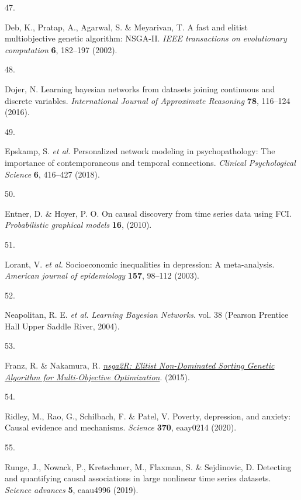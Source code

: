 \documentclass[
]{article}
\newlength{\cslhangindent}
\newlength{\csllabelwidth}
\newenvironment{CSLReferences}[2] %
 {\begin{list}{}{%
  \setlength{\itemindent}{0pt}
  \setlength{\leftmargin}{0pt}
  \setlength{\parsep}{0pt}
  \ifodd #1
   \setlength{\leftmargin}{\cslhangindent}
   \setlength{\itemindent}{-1\cslhangindent}
  \fi
  \setlength{\itemsep}{#2\baselineskip}}}
 {\end{list}}
\newcommand{\CSLLeftMargin}[1]{\parbox[t]{\csllabelwidth}{\strut#1\strut}}
\newcommand{\CSLRightInline}[1]{\parbox[t]{\linewidth - \csllabelwidth}{\strut#1\strut}}
\begin{document}
\begin{CSLReferences}{0}{0}
\CSLLeftMargin{47. }%
\CSLRightInline{Deb, K., Pratap, A., Agarwal, S. \& Meyarivan, T. A fast
and elitist multiobjective genetic algorithm: NSGA-II. \emph{IEEE
transactions on evolutionary computation} \textbf{6}, 182--197 (2002).}

\CSLLeftMargin{48. }%
\CSLRightInline{Dojer, N. Learning bayesian networks from datasets
joining continuous and discrete variables. \emph{International Journal
of Approximate Reasoning} \textbf{78}, 116--124 (2016).}

\CSLLeftMargin{49. }%
\CSLRightInline{Epskamp, S. \emph{et al.} Personalized network modeling
in psychopathology: The importance of contemporaneous and temporal
connections. \emph{Clinical Psychological Science} \textbf{6}, 416--427
(2018).}

\CSLLeftMargin{50. }%
\CSLRightInline{Entner, D. \& Hoyer, P. O. On causal discovery from time
series data using FCI. \emph{Probabilistic graphical models}
\textbf{16}, (2010).}

\CSLLeftMargin{51. }%
\CSLRightInline{Lorant, V. \emph{et al.} Socioeconomic inequalities in
depression: A meta-analysis. \emph{American journal of epidemiology}
\textbf{157}, 98--112 (2003).}

\CSLLeftMargin{52. }%
\CSLRightInline{Neapolitan, R. E. \emph{et al.} \emph{Learning Bayesian
Networks}. vol. 38 (Pearson Prentice Hall Upper Saddle River, 2004).}

\CSLLeftMargin{53. }%
\CSLRightInline{Franz, R. \& Nakamura, R.
\emph{\href{https://CRAN.R-project.org/package=nsga2R}{nsga2R: Elitist
Non-Dominated Sorting Genetic Algorithm for Multi-Objective
Optimization}}. (2015).}

\CSLLeftMargin{54. }%
\CSLRightInline{Ridley, M., Rao, G., Schilbach, F. \& Patel, V. Poverty,
depression, and anxiety: Causal evidence and mechanisms. \emph{Science}
\textbf{370}, eaay0214 (2020).}

\CSLLeftMargin{55. }%
\CSLRightInline{Runge, J., Nowack, P., Kretschmer, M., Flaxman, S. \&
Sejdinovic, D. Detecting and quantifying causal associations in large
nonlinear time series datasets. \emph{Science advances} \textbf{5},
eaau4996 (2019).}


\end{CSLReferences}
\end{document}
